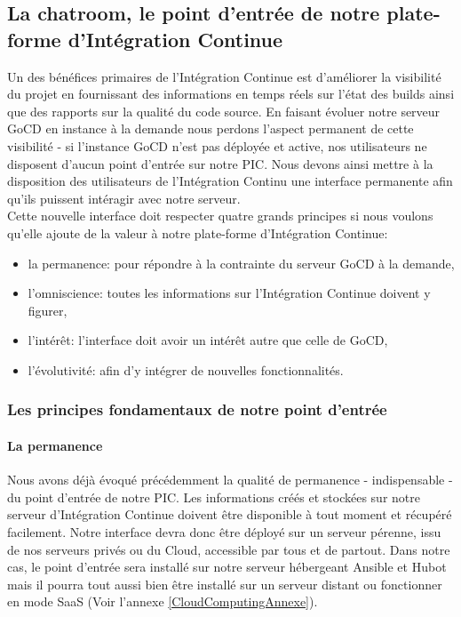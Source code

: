       \subsection{La chatroom, le point d'entrée de notre plate-forme d'Intégration Continue}
      Un des bénéfices primaires de l'Intégration Continue est d'améliorer la visibilité du projet en fournissant des informations en temps réels sur l'état des builds ainsi que des rapports sur la qualité du code source. En faisant évoluer notre serveur GoCD en instance à la demande nous perdons l'aspect permanent de cette visibilité - si l'instance GoCD n'est pas déployée et active, nos utilisateurs ne disposent d'aucun point d'entrée sur notre PIC. Nous devons ainsi mettre à la disposition des utilisateurs de l'Intégration Continu une interface permanente afin qu'ils puissent intéragir avec notre serveur.\\

      Cette nouvelle interface doit respecter quatre grands principes si nous voulons qu'elle ajoute de la valeur à notre plate-forme d'Intégration Continue:\\

      \begin{itemize}
        \item la permanence: pour répondre à la contrainte du serveur GoCD à la demande,
        \item l'omniscience: toutes les informations sur l'Intégration Continue doivent y figurer,
        \item l'intérêt: l'interface doit avoir un intérêt autre que celle de GoCD,
        \item l'évolutivité: afin d'y intégrer de nouvelles fonctionnalités.\\
      \end{itemize}

        \subsubsection{Les principes fondamentaux de notre point d'entrée}
          \paragraph{La permanence} Nous avons déjà évoqué précédemment la qualité de permanence - indispensable - du point d'entrée de notre PIC. Les informations créés et stockées sur notre serveur d'Intégration Continue doivent être disponible à tout moment et récupéré facilement. Notre interface devra donc être déployé sur un serveur pérenne, issu de nos serveurs privés ou du Cloud, accessible par tous et de partout.
          Dans notre cas, le point d'entrée sera installé sur notre serveur hébergeant Ansible et Hubot mais il pourra tout aussi bien être installé sur un serveur distant ou fonctionner en mode SaaS (Voir l'annexe \ref{CloudComputingAnnexe}).

